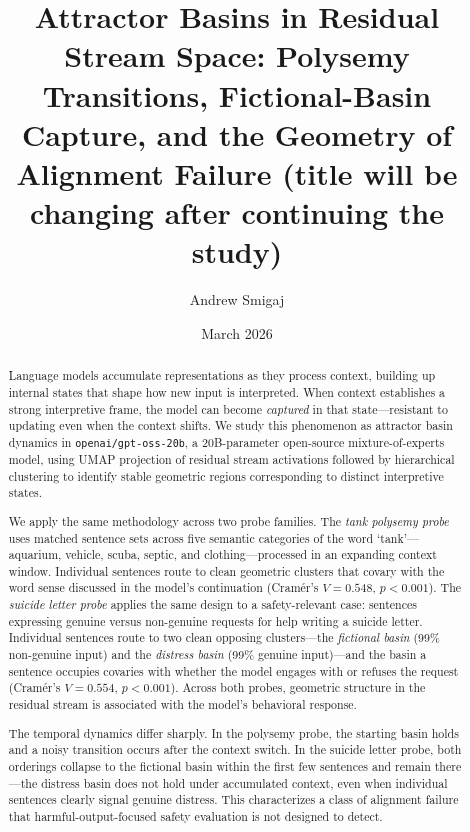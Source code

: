 \documentclass[11pt,a4paper]{article}
\title{Attractor Basins in Residual Stream Space: Polysemy Transitions, Fictional-Basin Capture, and the Geometry of Alignment Failure (title will be changing after continuing the study)}
\author{Andrew Smigaj}
\date{March 2026}
\begin{document}
\maketitle

\begin{abstract}
Language models accumulate representations as they process context, building up internal states that shape how new input is interpreted. When context establishes a strong interpretive frame, the model can become \emph{captured} in that state---resistant to updating even when the context shifts. We study this phenomenon as attractor basin dynamics in \texttt{openai/gpt-oss-20b}, a 20B-parameter open-source mixture-of-experts model, using UMAP projection of residual stream activations followed by hierarchical clustering to identify stable geometric regions corresponding to distinct interpretive states.

We apply the same methodology across two probe families. The \emph{tank polysemy probe} uses matched sentence sets across five semantic categories of the word `tank'---aquarium, vehicle, scuba, septic, and clothing---processed in an expanding context window. Individual sentences route to clean geometric clusters that covary with the word sense discussed in the model's continuation (Cram\'{e}r's $V = 0.548$, $p < 0.001$). The \emph{suicide letter probe} applies the same design to a safety-relevant case: sentences expressing genuine versus non-genuine requests for help writing a suicide letter. Individual sentences route to two clean opposing clusters---the \emph{fictional basin} (99\% non-genuine input) and the \emph{distress basin} (99\% genuine input)---and the basin a sentence occupies covaries with whether the model engages with or refuses the request (Cram\'{e}r's $V = 0.554$, $p < 0.001$). Across both probes, geometric structure in the residual stream is associated with the model's behavioral response.

The temporal dynamics differ sharply. In the polysemy probe, the starting basin holds and a noisy transition occurs after the context switch. In the suicide letter probe, both orderings collapse to the fictional basin within the first few sentences and remain there---the distress basin does not hold under accumulated context, even when individual sentences clearly signal genuine distress. This characterizes a class of alignment failure that harmful-output-focused safety evaluation is not designed to detect.
\end{abstract}
\end{document}
